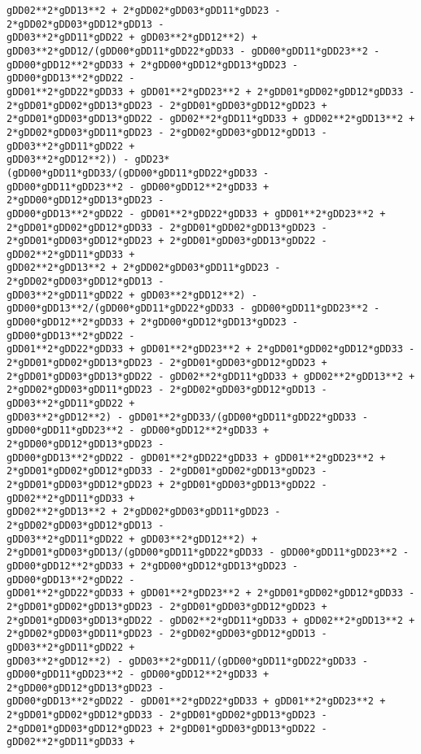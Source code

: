 \documentclass[landscape,letterpaper,10pt,english]{article}
\begin{document}
\begin{Verbatim}[commandchars=\\\{\}]
gDD02**2*gDD13**2 + 2*gDD02*gDD03*gDD11*gDD23 - 2*gDD02*gDD03*gDD12*gDD13 -
gDD03**2*gDD11*gDD22 + gDD03**2*gDD12**2) +
gDD03**2*gDD12/(gDD00*gDD11*gDD22*gDD33 - gDD00*gDD11*gDD23**2 -
gDD00*gDD12**2*gDD33 + 2*gDD00*gDD12*gDD13*gDD23 - gDD00*gDD13**2*gDD22 -
gDD01**2*gDD22*gDD33 + gDD01**2*gDD23**2 + 2*gDD01*gDD02*gDD12*gDD33 -
2*gDD01*gDD02*gDD13*gDD23 - 2*gDD01*gDD03*gDD12*gDD23 +
2*gDD01*gDD03*gDD13*gDD22 - gDD02**2*gDD11*gDD33 + gDD02**2*gDD13**2 +
2*gDD02*gDD03*gDD11*gDD23 - 2*gDD02*gDD03*gDD12*gDD13 - gDD03**2*gDD11*gDD22 +
gDD03**2*gDD12**2)) - gDD23*(gDD00*gDD11*gDD33/(gDD00*gDD11*gDD22*gDD33 -
gDD00*gDD11*gDD23**2 - gDD00*gDD12**2*gDD33 + 2*gDD00*gDD12*gDD13*gDD23 -
gDD00*gDD13**2*gDD22 - gDD01**2*gDD22*gDD33 + gDD01**2*gDD23**2 +
2*gDD01*gDD02*gDD12*gDD33 - 2*gDD01*gDD02*gDD13*gDD23 -
2*gDD01*gDD03*gDD12*gDD23 + 2*gDD01*gDD03*gDD13*gDD22 - gDD02**2*gDD11*gDD33 +
gDD02**2*gDD13**2 + 2*gDD02*gDD03*gDD11*gDD23 - 2*gDD02*gDD03*gDD12*gDD13 -
gDD03**2*gDD11*gDD22 + gDD03**2*gDD12**2) -
gDD00*gDD13**2/(gDD00*gDD11*gDD22*gDD33 - gDD00*gDD11*gDD23**2 -
gDD00*gDD12**2*gDD33 + 2*gDD00*gDD12*gDD13*gDD23 - gDD00*gDD13**2*gDD22 -
gDD01**2*gDD22*gDD33 + gDD01**2*gDD23**2 + 2*gDD01*gDD02*gDD12*gDD33 -
2*gDD01*gDD02*gDD13*gDD23 - 2*gDD01*gDD03*gDD12*gDD23 +
2*gDD01*gDD03*gDD13*gDD22 - gDD02**2*gDD11*gDD33 + gDD02**2*gDD13**2 +
2*gDD02*gDD03*gDD11*gDD23 - 2*gDD02*gDD03*gDD12*gDD13 - gDD03**2*gDD11*gDD22 +
gDD03**2*gDD12**2) - gDD01**2*gDD33/(gDD00*gDD11*gDD22*gDD33 -
gDD00*gDD11*gDD23**2 - gDD00*gDD12**2*gDD33 + 2*gDD00*gDD12*gDD13*gDD23 -
gDD00*gDD13**2*gDD22 - gDD01**2*gDD22*gDD33 + gDD01**2*gDD23**2 +
2*gDD01*gDD02*gDD12*gDD33 - 2*gDD01*gDD02*gDD13*gDD23 -
2*gDD01*gDD03*gDD12*gDD23 + 2*gDD01*gDD03*gDD13*gDD22 - gDD02**2*gDD11*gDD33 +
gDD02**2*gDD13**2 + 2*gDD02*gDD03*gDD11*gDD23 - 2*gDD02*gDD03*gDD12*gDD13 -
gDD03**2*gDD11*gDD22 + gDD03**2*gDD12**2) +
2*gDD01*gDD03*gDD13/(gDD00*gDD11*gDD22*gDD33 - gDD00*gDD11*gDD23**2 -
gDD00*gDD12**2*gDD33 + 2*gDD00*gDD12*gDD13*gDD23 - gDD00*gDD13**2*gDD22 -
gDD01**2*gDD22*gDD33 + gDD01**2*gDD23**2 + 2*gDD01*gDD02*gDD12*gDD33 -
2*gDD01*gDD02*gDD13*gDD23 - 2*gDD01*gDD03*gDD12*gDD23 +
2*gDD01*gDD03*gDD13*gDD22 - gDD02**2*gDD11*gDD33 + gDD02**2*gDD13**2 +
2*gDD02*gDD03*gDD11*gDD23 - 2*gDD02*gDD03*gDD12*gDD13 - gDD03**2*gDD11*gDD22 +
gDD03**2*gDD12**2) - gDD03**2*gDD11/(gDD00*gDD11*gDD22*gDD33 -
gDD00*gDD11*gDD23**2 - gDD00*gDD12**2*gDD33 + 2*gDD00*gDD12*gDD13*gDD23 -
gDD00*gDD13**2*gDD22 - gDD01**2*gDD22*gDD33 + gDD01**2*gDD23**2 +
2*gDD01*gDD02*gDD12*gDD33 - 2*gDD01*gDD02*gDD13*gDD23 -
2*gDD01*gDD03*gDD12*gDD23 + 2*gDD01*gDD03*gDD13*gDD22 - gDD02**2*gDD11*gDD33 +

\end{Verbatim}
\end{document}
